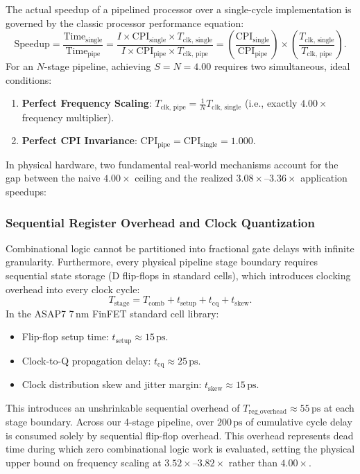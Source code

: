 The actual speedup of a pipelined processor over a single-cycle implementation is governed by the classic processor performance equation:
\begin{equation}
\text{Speedup} = \frac{\text{Time}_{\text{single}}}{\text{Time}_{\text{pipe}}} = \frac{I \times \text{CPI}_{\text{single}} \times T_{\text{clk, single}}}{I \times \text{CPI}_{\text{pipe}} \times T_{\text{clk, pipe}}} = \left(\frac{\text{CPI}_{\text{single}}}{\text{CPI}_{\text{pipe}}}\right) \times \left(\frac{T_{\text{clk, single}}}{T_{\text{clk, pipe}}}\right).
\end{equation}
For an $N$-stage pipeline, achieving $S = N = 4.00$ requires two simultaneous, ideal conditions:
\begin{enumerate}
    \item \textbf{Perfect Frequency Scaling}: $T_{\text{clk, pipe}} = \frac{1}{N} T_{\text{clk, single}}$ (i.e., exactly $4.00\times$ frequency multiplier).
    \item \textbf{Perfect CPI Invariance}: $\text{CPI}_{\text{pipe}} = \text{CPI}_{\text{single}} = 1.000$.
\end{enumerate}
In physical hardware, two fundamental real-world mechanisms account for the gap between the naive $4.00\times$ ceiling and the realized $3.08\times\text{--}3.36\times$ application speedups:

\subsubsection{Sequential Register Overhead and Clock Quantization}
Combinational logic cannot be partitioned into fractional gate delays with infinite granularity. Furthermore, every physical pipeline stage boundary requires sequential state storage (D flip-flops in standard cells), which introduces clocking overhead into every clock cycle:
\begin{equation}
T_{\text{stage}} = T_{\text{comb}} + t_{\text{setup}} + t_{\text{cq}} + t_{\text{skew}}.
\end{equation}
In the ASAP7 7\,nm FinFET standard cell library:
\begin{itemize}
    \item Flip-flop setup time: $t_{\text{setup}} \approx 15\,\text{ps}$.
    \item Clock-to-Q propagation delay: $t_{\text{cq}} \approx 25\,\text{ps}$.
    \item Clock distribution skew and jitter margin: $t_{\text{skew}} \approx 15\,\text{ps}$.
\end{itemize}
This introduces an unshrinkable sequential overhead of $T_{\text{reg\_overhead}} \approx 55\,\text{ps}$ at each stage boundary. Across our 4-stage pipeline, over $200\,\text{ps}$ of cumulative cycle delay is consumed solely by sequential flip-flop overhead. This overhead represents dead time during which zero combinational logic work is evaluated, setting the physical upper bound on frequency scaling at $3.52\times\text{--}3.82\times$ rather than $4.00\times$.

